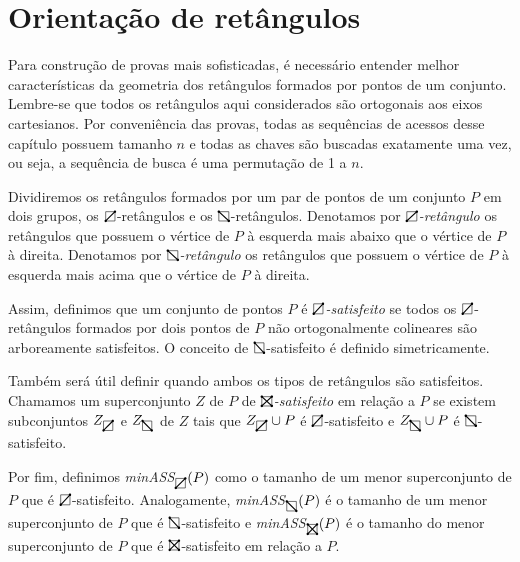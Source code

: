 \section{Orientação de retângulos}

Para construção de provas mais sofisticadas, é necessário entender melhor características da geometria dos retângulos formados por pontos de um conjunto. Lembre-se que todos os retângulos aqui considerados são ortogonais aos eixos cartesianos. Por conveniência das provas, todas as sequências de acessos desse capítulo possuem tamanho $n$ e todas as chaves são buscadas exatamente uma vez, ou seja, a sequência de busca é uma permutação de 1 a $n$.

Dividiremos os retângulos formados por um par de pontos de um conjunto $P$ em dois grupos, os $\rectpos$-retângulos e os $\rectneg$-retângulos. Denotamos por $\rectpos$\textit{-retângulo} os retângulos que possuem o vértice de $P$ à esquerda mais abaixo que o vértice de $P$ à direita. Denotamos por $\rectneg$\textit{-retângulo} os retângulos que possuem o vértice de $P$ à esquerda mais acima que o vértice de $P$ à direita.

Assim, definimos que um conjunto de pontos $P$ é $\rectpos$\textit{-satisfeito} se todos os $\rectpos$-retângulos formados por dois pontos de $P$ não ortogonalmente colineares são arboreamente satisfeitos. O conceito de $\rectneg$-satisfeito é definido simetricamente.

Também será útil definir quando ambos os tipos de retângulos são satisfeitos. Chamamos um superconjunto $Z$ de $P$ de $\recttotal$\textit{-satisfeito} em relação a $P$ se existem subconjuntos $Z_{\rectpos}$ e $Z_{\rectneg}$ de $Z$ tais que $Z_{\rectpos} \cup P$ é $\rectpos$-satisfeito e $Z_{\rectneg} \cup P$ é $\rectneg$-satisfeito.  


Por fim, definimos \textit{minASS}$_{\rectpos}(P)$ como o tamanho de um menor superconjunto de $P$ que é $\rectpos$-satisfeito. Analogamente, \textit{minASS}$_{\rectneg}(P)$ é o tamanho de um menor superconjunto de $P$ que é $\rectneg$-satisfeito e \textit{minASS}$_{\recttotal}(P)$ é o tamanho do menor superconjunto de $P$ que é $\recttotal$-satisfeito em relação a $P$.

